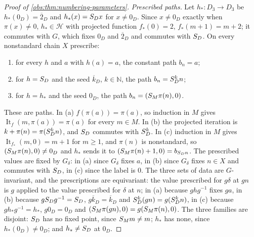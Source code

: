 \begin{proof}[Proof of \cref{obs:thm:numbering-parameters}]
\emph{Prescribed paths.} Let $h_{*}\colon D_3\to D_3$ be $h_{*}(0_D)=\overline{2}_D$
and $h_{*}(x)=S_Dx$ for $x\ne 0_D$. Since $x\ne 0_D$ exactly when
$\pi(x)\ne 0$, $h_{*}\in\mathscr{H}$ with projected function $f_{*}(0)=2$,
$f_{*}(m+1)=m+2$; it commutes with $G$, which fixes $0_D$ and
$\overline{2}_D$ and commutes with $S_D$. On every nonstandard chain $X$
prescribe:
\begin{enumerate}[label=(\alph*)]
\item for every $h$ and $a$ with $h(a)=a$, the constant path $b_n=a$;
\item for $h=S_D$ and the seed $\overline{k}_D$, $k\in\mathbb{N}$, the path
$b_n=S_D^{k}n$;
\item for $h=h_{*}$ and the seed $0_D$, the path $b_n=(S_M\pi(n),0)$.
\end{enumerate}
These are paths. In (a) $f(\pi(a))=\pi(a)$, so induction in $M$ gives
$\operatorname{It}_f(m,\pi(a))=\pi(a)$ for every $m\in M$. In (b) the projected
iteration is $k+\pi(n)=\pi(S_D^{k}n)$, and $S_D$ commutes with
$S_D^{k}$. In (c) induction in $M$ gives $\operatorname{It}_{f_{*}}(m,0)=m+1$
for $m\ge 1$, and $\pi(n)$ is nonstandard, so $(S_M\pi(n),0)\ne 0_D$ and
$h_{*}$ sends it to $(S_M\pi(n)+1,0)=b_{S_Dn}$. The prescribed values are
fixed by $G_\delta$: in (a) since $G_\delta$ fixes $a$, in (b) since $G_\delta$
fixes $n\in X$ and commutes with $S_D$, in (c) since the label is $0$. The
three sets of data are $G$-invariant, and the prescriptions are equivariant:
the value prescribed for $g\delta$ at $gn$ is $g$ applied to the value
prescribed for $\delta$ at $n$; in (a) because $ghg^{-1}$ fixes $ga$, in (b)
because $gS_Dg^{-1}=S_D$, $g\overline{k}_D=\overline{k}_D$ and
$S_D^{k}(gn)=g(S_D^{k}n)$, in (c) because $gh_{*}g^{-1}=h_{*}$,
$g0_D=0_D$ and $(S_M\pi(gn),0)=g(S_M\pi(n),0)$. The three families are
disjoint: $S_D$ has no fixed point, since $S_Mm\ne m$; $h_{*}$ has none,
since $h_{*}(0_D)\ne 0_D$; and $h_{*}\ne S_D$ at $0_D$.


\end{proof}
